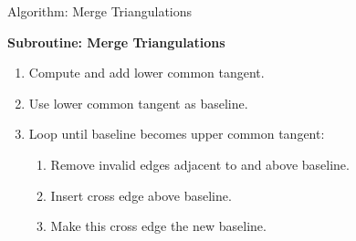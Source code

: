 \documentclass[aspectratio=169,fleqn]{beamer}
\begin{document}
  \begin{frame}{Algorithm: Merge Triangulations}
    \onslide<+->
    \onslide<+->
    \begin{mybox}
      \textbf{Subroutine: Merge Triangulations}
      \begin{enumerate}
        \item<+-> Compute and add lower common tangent.
        \item<+-> Use lower common tangent as baseline.
        \item<+-> Loop until baseline becomes upper common tangent:
          \begin{enumerate}
            \item<+-> Remove invalid edges adjacent to and above baseline.
            \item<+-> Insert cross edge above baseline.
            \item<+-> Make this cross edge the new baseline.
          \end{enumerate}

\end{enumerate}
\end{mybox}
\end{frame}
\end{document}
